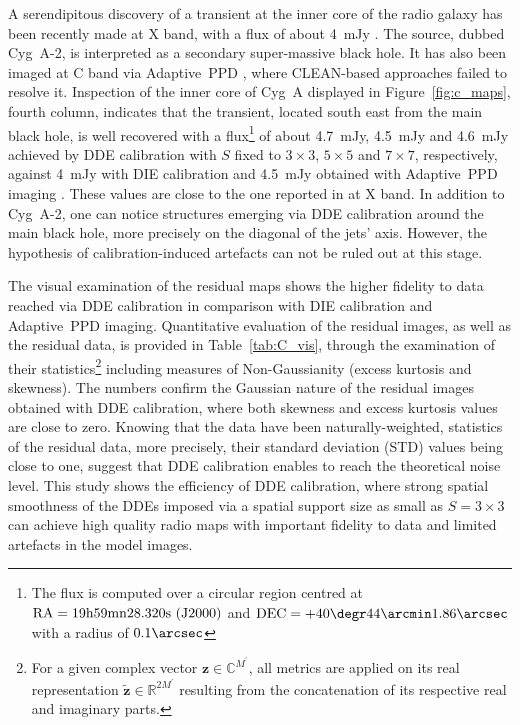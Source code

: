 \documentclass[fleqn,usenatbib]{mnras}
\newcommand{\alg}[1]{\textsc{#1}}
\newcommand{\zb}{\ensuremath{\boldsymbol{z}}}
\newcommand{\eC}{\mathbb{C}}
\newcommand{\eR}{\mathbb{R}}
\begin{document}
A serendipitous discovery of a transient at the inner core of the radio galaxy has been recently made at X band, with a flux of about 4~mJy \citep{perley2017}. The source, dubbed Cyg~A-2, is interpreted as a secondary super-massive black hole. It has also been imaged at C band via {Adaptive~PPD} \citep{Dabbech2018}, where \alg{CLEAN}-based approaches failed to resolve it. Inspection of the inner core of Cyg~A displayed in Figure~\ref{fig:c_maps}, fourth column, indicates that the transient, located south east from the main black hole, is well recovered with a flux\footnote{The flux is computed over a circular region centred at $\rm{RA}=19\rm{h}59\rm{mn}28.320\rm{s}~ (J2000)$ and $\rm{DEC}=+40\degr 44\arcmin 1.86\arcsec$ with a radius of $0.1\arcsec$} of about 4.7~mJy, 4.5~mJy and 4.6~mJy achieved by DDE calibration with $S$ fixed to $3\times 3$, $5\times5$ and $7\times 7$, respectively, against 4~mJy with DIE calibration and 4.5~mJy obtained with {Adaptive~PPD} imaging \citep{Dabbech2018}. These values are close to the one reported in \citet{perley2017} at X band. In addition to Cyg~A-2, one can notice structures emerging via DDE calibration around the main black hole, more precisely on the diagonal of the jets' axis. However, the hypothesis of calibration-induced artefacts can not be ruled out at this stage. 

The visual examination of the residual maps shows the higher fidelity to data reached via DDE calibration in comparison with DIE calibration and {Adaptive~PPD} imaging. Quantitative evaluation of the residual images, as well as the residual data, is provided in Table~\ref{tab:C_vis}, through the examination of their statistics\footnote{For a given complex vector $\zb\in \eC^{M^{\prime}}$, all metrics are applied on its real representation $\tilde{\zb}\in \eR^{2 {M^{\prime}}} $ resulting from the concatenation of its respective real and imaginary parts.} including measures of Non-Gaussianity (excess kurtosis and skewness). The numbers confirm the Gaussian nature of the residual images obtained with DDE calibration, where both skewness and excess kurtosis values are close to zero. Knowing that the data have been naturally-weighted, statistics of the residual data, more precisely, their standard deviation (STD) values being close to one, suggest that DDE calibration enables to reach the theoretical noise level.
This study shows the efficiency of DDE calibration, where strong spatial smoothness of the DDEs imposed via a spatial support size as small as $S=3\times3$ can achieve high quality radio maps with important fidelity to data and limited artefacts in the model images. 
\end{document}
